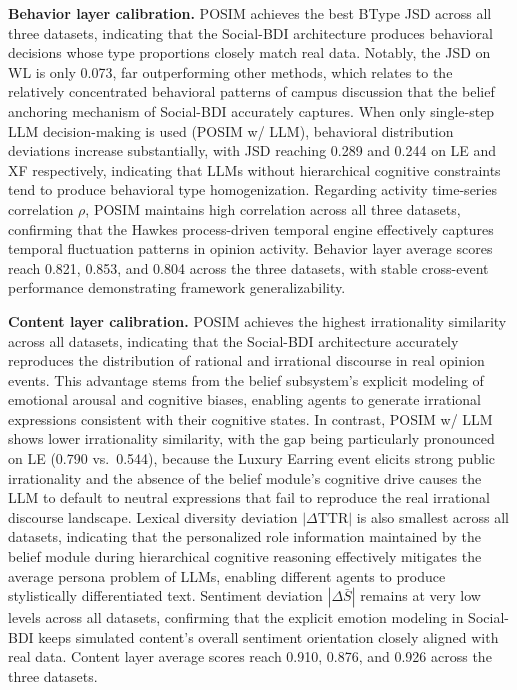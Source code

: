 \documentclass[a4paper,fleqn]{cas-dc}
\begin{document}
\textbf{Behavior layer calibration.} POSIM achieves the best BType JSD across all three datasets, indicating that the Social-BDI architecture produces behavioral decisions whose type proportions closely match real data. Notably, the JSD on WL is only 0.073, far outperforming other methods, which relates to the relatively concentrated behavioral patterns of campus discussion that the belief anchoring mechanism of Social-BDI accurately captures. When only single-step LLM decision-making is used (POSIM w/ LLM), behavioral distribution deviations increase substantially, with JSD reaching 0.289 and 0.244 on LE and XF respectively, indicating that LLMs without hierarchical cognitive constraints tend to produce behavioral type homogenization. Regarding activity time-series correlation $\rho$, POSIM maintains high correlation across all three datasets, confirming that the Hawkes process-driven temporal engine effectively captures temporal fluctuation patterns in opinion activity. Behavior layer average scores reach 0.821, 0.853, and 0.804 across the three datasets, with stable cross-event performance demonstrating framework generalizability.

\textbf{Content layer calibration.} POSIM achieves the highest irrationality similarity across all datasets, indicating that the Social-BDI architecture accurately reproduces the distribution of rational and irrational discourse in real opinion events. This advantage stems from the belief subsystem's explicit modeling of emotional arousal and cognitive biases, enabling agents to generate irrational expressions consistent with their cognitive states. In contrast, POSIM w/ LLM shows lower irrationality similarity, with the gap being particularly pronounced on LE (0.790 vs.\ 0.544), because the Luxury Earring event elicits strong public irrationality and the absence of the belief module's cognitive drive causes the LLM to default to neutral expressions that fail to reproduce the real irrational discourse landscape. Lexical diversity deviation $|\Delta\text{TTR}|$ is also smallest across all datasets, indicating that the personalized role information maintained by the belief module during hierarchical cognitive reasoning effectively mitigates the average persona problem of LLMs, enabling different agents to produce stylistically differentiated text. Sentiment deviation $|\Delta\bar{S}|$ remains at very low levels across all datasets, confirming that the explicit emotion modeling in Social-BDI keeps simulated content's overall sentiment orientation closely aligned with real data. Content layer average scores reach 0.910, 0.876, and 0.926 across the three datasets.
\end{document}
